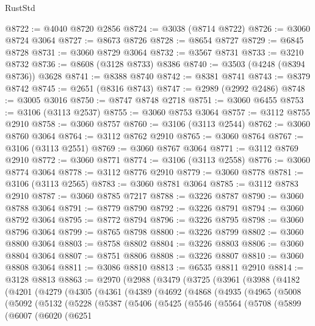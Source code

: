 \begin{lexlean}{RustStd}
\begin{coremodule}
@8722 := @4040 @8720 @2856
@8724 := @3038 (@8714 @8722)
@8726 := @3060 @8724 @3064
@8727 := @8673 @8726
@8728 := @8654 @8727
@8729 := @6845 @8728
@8731 := @3060 @8729 @3064
@8732 := @3567 @8731
@8733 := @3210 @8732
@8736 := @8608 (@3128 @8733) @8386
@8740 := @3503 (@4248 (@8394 @8736)) @3628
@8741 := @8388 @8740
@8742 := @8381 @8741
@8743 := @8379 @8742
@8745 := @2651 (@8316 @8743)
@8747 := @2989 (@2992 @2486)
@8748 := @3005 @3016
@8750 := @8747 @8748 @2718
@8751 := @3060 @6455
@8753 := @3106 (@3113 @2537)
@8755 := @3060 @8753 @3064
@8757 := @3112 @8755 @2910
@8758 := @3060 @8757
@8760 := @3106 (@3113 @2544)
@8762 := @3060 @8760 @3064
@8764 := @3112 @8762 @2910
@8765 := @3060 @8764
@8767 := @3106 (@3113 @2551)
@8769 := @3060 @8767 @3064
@8771 := @3112 @8769 @2910
@8772 := @3060 @8771
@8774 := @3106 (@3113 @2558)
@8776 := @3060 @8774 @3064
@8778 := @3112 @8776 @2910
@8779 := @3060 @8778
@8781 := @3106 (@3113 @2565)
@8783 := @3060 @8781 @3064
@8785 := @3112 @8783 @2910
@8787 := @3060 @8785 @7217
@8788 := @3226 @8787
@8790 := @3060 @8788 @3064
@8791 := @8779 @8790
@8792 := @3226 @8791
@8794 := @3060 @8792 @3064
@8795 := @8772 @8794
@8796 := @3226 @8795
@8798 := @3060 @8796 @3064
@8799 := @8765 @8798
@8800 := @3226 @8799
@8802 := @3060 @8800 @3064
@8803 := @8758 @8802
@8804 := @3226 @8803
@8806 := @3060 @8804 @3064
@8807 := @8751 @8806
@8808 := @3226 @8807
@8810 := @3060 @8808 @3064
@8811 := @3086 @8810
@8813 := @6535 @8811 @2910
@8814 := @3128 @8813
@8863 := @2970
    (@2988
      (@3479
        (@3725
          (@3961
            (@3988
              (@4182
                (@4201
                  (@4279
                    (@4305
                      (@4361
                        (@4389
                          (@4692
                            (@4868
                              (@4935
                                (@4965
                                  (@5008
                                    (@5092
                                      (@5132
                                        (@5228
                                          (@5387
                                            (@5406
                                              (@5425
                                                (@5546
                                                  (@5564
                                                    (@5708
                                                      (@5899
                                                        (@6007
                                                          (@6020
                                                            (@6251

\end{coremodule}
\end{lexlean}
